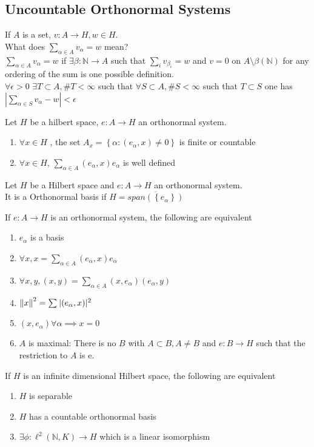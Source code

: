 \documentclass[../main.tex]{subfiles}
\begin{document}
\subsection{Uncountable Orthonormal Systems}
If $A$ is a set, $v: A\to H,w \in H$.\\
What does $ \sum_{\alpha\in A}^{ }v_\alpha=w$ mean?\\
$ \sum_{\alpha\in A}^{ } v_\alpha = w $ if $\exists \beta: \mathbb{N}\to A$ such that $ \sum_{i}^{ }v_{\beta_i} = w $ and $v=0 $ on $A\setminus \beta( \mathbb{N}) $ for any ordering of the sum is one possible definition.\\
$\forall \epsilon>0$ $\exists T \subset A, \# T < \infty $ such that $\forall S \subset A, \# S < \infty $ such that $T \subset S$ one has $| \sum_{\alpha\in S}^{ }v_\alpha -w| < \epsilon$ 
\begin{propo}
Let $H$ be a hilbert space, $e: A\to H$ an orthonormal system.
\begin{enumerate}
\item $\forall x\in H$ , the set $A_x = \left\{ \alpha: ( e_\alpha,x) \neq 0 \right\} $ is finite or countable
\item $\forall x \in H$, $ \sum_{\alpha\in A}^{ } ( e_\alpha,x) e_\alpha$ is well defined
\end{enumerate}
\end{propo}
\begin{defn}
	Let $H$ be a Hilbert space and $e: A\to H$ an orthonormal system.\\
	It is a Orthonormal basis if $H = \overline{ span( \left\{ e_\alpha \right\} ) }$
\end{defn}
\begin{thm}
	If $e: A\to H$ is an orthonormal system, the following are equivalent
	\begin{enumerate}
	\item $e_\alpha$ is a basis
	\item $\forall x, x= \sum_{\alpha\in A}^{ }( e_\alpha,x) e_\alpha$ 
	\item $\forall x,y, ( x,y) = \sum_{\alpha\in A}^{ } ( x,e_\alpha) ( e_\alpha,y) $ 
	\item $\left\lVert x\right\rVert^{2} = \sum_{}^{ } |( e_\alpha,x) |^{2}$ 
	\item $( x,e_\alpha) \forall \alpha \implies x=0$ 
	\item $A$ is maximal: There is no $B$ with $A \subset B, A \neq B$ and $e: B \to H$ such that the restriction to $A$ is e.
	\end{enumerate}
\end{thm}
\begin{thm}
	If $H$ is an infinite dimensional Hilbert space, the following are equivalent
	\begin{enumerate}
	\item $H$ is separable
	\item $H$ has a countable orthonormal basis
	\item $\exists \phi: \ell^{2}( \mathbb{N},K)\to H $ which is a linear isomorphism
	\end{enumerate}
\end{thm}
\end{document}
